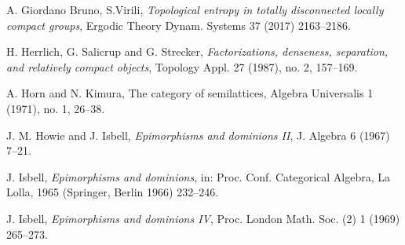 \documentclass[12pt]{article}
\theoremstyle{definition}
\def\NBD{$\maltese\ $}
\numberwithin{equation}{section}
\begin{document}
\begin{thebibliography}{999}
{%



 {A. Giordano Bruno, S.Virili}, \textit{Topological entropy in totally disconnected locally compact groups}, Ergodic Theory Dynam. Systems 37 (2017) 2163--2186.



 
%


 H. Herrlich, G. Salicrup and G. Strecker, {\em Factorizations, denseness, separation, and relatively compact objects}, 
Topology Appl. 27 (1987), no. 2, 157--169. 

 A. Horn and N. Kimura, {The category of semilattices}, Algebra Universalis 1 (1971), no. 1, 26--38.

 J. M. Howie and J. Isbell, {\em Epimorphisms and dominions II}, J. Algebra 6 (1967) 7--21.


 {J. Isbell}, \emph{Epimorphisms and dominions}, in: Proc. Conf. Categorical Algebra, La Lolla, 1965 (Springer, Berlin 1966) 232--246.

 {J. Isbell}, \emph{Epimorphisms and dominions IV}, Proc. London Math. Soc. (2) 1 (1969) 265--273.

}
\end{thebibliography}
\end{document}
